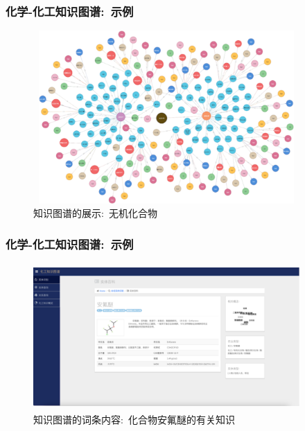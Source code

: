 \begin{frame}
	\frametitle{化学-化工知识图谱:~示例}
\begin{figure}[h!]
\centering
\includegraphics[height=2.60in,width=4.00in,viewport=0 0 240 180,clip]{Figures/KG_Chem-Inorganic.png}
\caption{\tiny 知识图谱的展示:~无机化合物}%
\label{Fig:KG_Chem-Inorganic}
\end{figure}
\end{frame}

\begin{frame}
	\frametitle{化学-化工知识图谱:~示例}
\begin{figure}[h!]
\centering
\includegraphics[height=2.20in,width=4.00in,viewport=0 0 240 130,clip]{Figures/KG_Chem-Enflurane.png}
\caption{\tiny 知识图谱的词条内容:~化合物\textrm{安氟醚}的有关知识}%
\label{Fig:KG_Chem-Enflurane}
\end{figure}
\end{frame}

